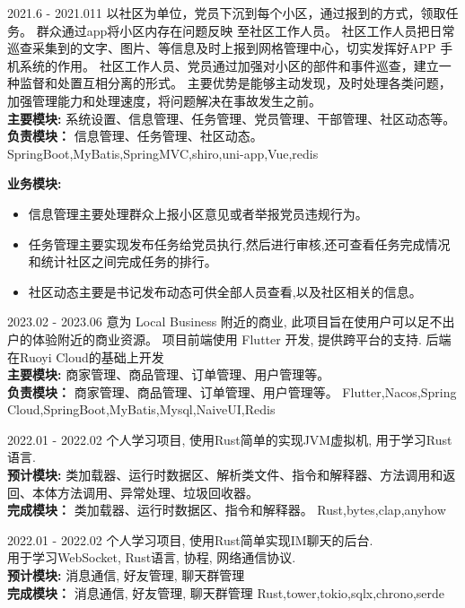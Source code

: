 \documentclass[zh]{resume}
\begin{document}
\begin{projects}
	\project
  {\color{accentcolor}{115社区}}{2021.6 - 2021.011}
  {
    以社区为单位，党员下沉到每个小区，通过报到的方式，领取任务。 
    群众通过app将小区内存在问题反映 至社区工作人员。 
    社区工作人员把日常巡查采集到的文字、图片、等信息及时上报到网格管理中心，切实发挥好APP 手机系统的作用。
    社区工作人员、党员通过加强对小区的部件和事件巡查，建立一种监督和处置互相分离的形式。
    主要优势是能够主动发现，及时处理各类问题，加强管理能力和处理速度，将问题解决在事故发生之前。 \\
    {\textbf{主要模块: } 系统设置、信息管理、任务管理、党员管理、干部管理、社区动态等。} \\
    {\textbf{负责模块：} 信息管理、任务管理、社区动态。}
  }
  {SpringBoot,MyBatis,SpringMVC,shiro,uni-app,Vue,redis}
  {
    {\textbf{业务模块:}}
    \begin{itemize}
      \item 信息管理主要处理群众上报小区意见或者举报党员违规行为。
      \item 任务管理主要实现发布任务给党员执行,然后进行审核,还可查看任务完成情况和统计社区之间完成任务的排行。
      \item 社区动态主要是书记发布动态可供全部人员查看,以及社区相关的信息。
    \end{itemize}
  }

	\project
  {\color{accentcolor}{LocalBiz}}{2023.02 - 2023.06}
  {
    意为 Local Business 附近的商业,  此项目旨在使用户可以足不出户的体验附近的商业资源。
    项目前端使用 Flutter 开发, 提供跨平台的支持. 后端在Ruoyi Cloud的基础上开发 \\
    {\textbf{主要模块: } 商家管理、商品管理、订单管理、用户管理等。} \\
    {\textbf{负责模块：} 商家管理、商品管理、订单管理、用户管理等。}
  }
  {Flutter,Nacos,Spring Cloud,SpringBoot,MyBatis,Mysql,NaiveUI,Redis}


	\project
  {\color{accentcolor}{jvmrs}}{2022.01 - 2022.02}
  {
    个人学习项目, 使用Rust简单的实现JVM虚拟机, 用于学习Rust语言. \\
    {\textbf{预计模块: } 类加载器、运行时数据区、解析类文件、指令和解释器、方法调用和返回、本体方法调用、异常处理、垃圾回收器。} \\
    {\textbf{完成模块：} 类加载器、运行时数据区、指令和解释器。}
  }
  {Rust,bytes,clap,anyhow}

	\project
  {\color{accentcolor}{eChat}}{2022.01 - 2022.02}
  {
    个人学习项目, 使用Rust简单实现IM聊天的后台.\\
    用于学习WebSocket, Rust语言, 协程, 网络通信协议. \\
    {\textbf{预计模块: } 消息通信, 好友管理, 聊天群管理} \\
    {\textbf{完成模块：} 消息通信, 好友管理, 聊天群管理}
  }
  {Rust,tower,tokio,sqlx,chrono,serde}

\end{projects}
\end{document}
